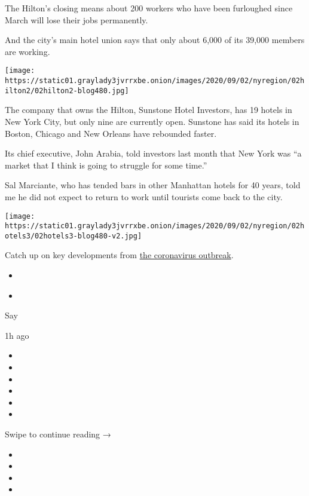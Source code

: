 The Hilton's closing means about 200 workers who have been furloughed
since March will lose their jobs permanently.

And the city's main hotel union says that only about 6,000 of its 39,000
members are working.

\texttt{[image: https://static01.graylady3jvrrxbe.onion/images/2020/09/02/nyregion/02hilton2/02hilton2-blog480.jpg]}

The company that owns the Hilton, Sunstone Hotel Investors, has 19
hotels in New York City, but only nine are currently open. Sunstone has
said its hotels in Boston, Chicago and New Orleans have rebounded
faster.

Its chief executive, John Arabia, told investors last month that New
York was ``a market that I think is going to struggle for some time.''

Sal Marciante, who has tended bars in other Manhattan hotels for 40
years, told me he did not expect to return to work until tourists come
back to the city.

\texttt{[image: https://static01.graylady3jvrrxbe.onion/images/2020/09/02/nyregion/02hotels3/02hotels3-blog480-v2.jpg]}

Catch up on key developments from
\href{https://www.nytimes3xbfgragh.onion/news-event/coronavirus}{the
coronavirus outbreak}.

\begin{itemize}
\tightlist
\item
  \href{https://www.nytimes3xbfgragh.onion/2020/09/02/health/trump-world-health-organization-coronavirus.html}{}
\item
  \href{https://www.nytimes3xbfgragh.onion/2020/09/02/business/inflation-worse-pandemic-coronavirus.html}{}
\end{itemize}

Say

1h ago

\begin{itemize}
\item
\item
\item
\item
\item
\item
\end{itemize}

Swipe to continue reading →

\begin{itemize}
\item
\item
\item
\item
\end{itemize}

